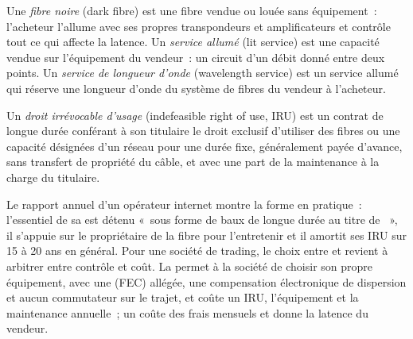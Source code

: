 \begin{definition}\label{def:nw:long-haul-fibre:dark}
Une \emph{fibre noire} (dark fibre) est une fibre vendue ou louée sans équipement~: l'acheteur l'allume avec ses propres transpondeurs et amplificateurs et
contrôle tout ce qui affecte la latence. Un \emph{service allumé} (lit service) est une capacité vendue sur l'équipement du vendeur~: un circuit d'un
débit donné entre deux points. Un \emph{service de longueur d'onde} (wavelength service) est un service allumé qui réserve une longueur d'onde du
système de fibres du vendeur à l'acheteur.
\end{definition}

\begin{definition}\label{def:nw:long-haul-fibre:iru}
Un \emph{droit irrévocable d'usage} (indefeasible right of use, IRU) est un contrat de longue durée conférant à son titulaire le droit exclusif d'utiliser
des fibres ou une capacité désignées d'un réseau pour une durée fixe, généralement payée d'avance, sans transfert de propriété du câble, et
avec une part de la maintenance à la charge du titulaire.
\end{definition}

Le rapport annuel d'un opérateur internet montre la forme en pratique~: l'essentiel de sa  est détenu «~sous forme de baux de longue durée
au titre de ~», il s'appuie sur le propriétaire de la fibre pour l'entretenir et il amortit ses IRU sur 15 à 20 ans en général. Pour une
société de trading, le choix entre  et  revient à arbitrer entre contrôle et coût. La  permet à la société de choisir son propre
équipement, avec une  (FEC) allégée, une compensation électronique de dispersion et aucun commutateur sur le trajet, et coûte un IRU, l'équipement et la maintenance annuelle~; un
 coûte des frais mensuels et donne la latence du vendeur.

